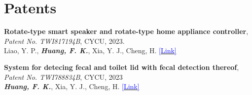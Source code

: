 \section{\textbf{Patents}}
 \begin{itemize}[leftmargin=0.in, label={}]
    \small{\item{
        \textbf{Rotate-type smart speaker and rotate-type home appliance controller}, \textit{Patent No. TWI817194B}, CYCU, 2023.  \\
        Liao, Y. P., \textit{\textbf{Huang, F. K.}}, Xia, Y. J., Cheng, H. \href{https://patents.google.com/patent/TWI817194B/en}{\textcolor{Blue}{[Link]}}\\
        
    }}
    \vspace{-1mm}
    \small{\item{
        \textbf{System for detecing fecal and toilet lid with fecal detection thereof}, \textit{Patent No. TWI788834B}, CYCU, 2023 \\
        \textit{\textbf{Huang, F. K.}}, Xia, Y. J., Cheng, H. \href{https://patents.google.com/patent/TWI788834B/en}{\textcolor{Blue}{[Link]}}
    }}
 \end{itemize}
 \vspace{-12pt}
